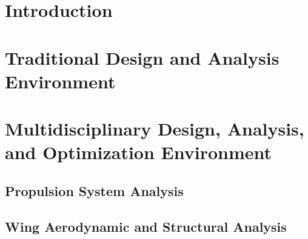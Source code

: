 \documentclass[conf]{new-aiaa}
\begin{document}

\section{Introduction}\label{sec:intro}

\section{Traditional Design and Analysis Environment}\label{sec:trad_process}

\section{Multidisciplinary Design, Analysis, and Optimization Environment}\label{sec:mdao_process}


\subsection{Propulsion System Analysis}

\subsection{Wing Aerodynamic and Structural Analysis}
\end{document}
